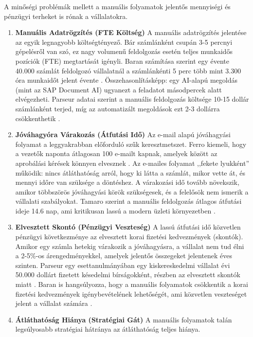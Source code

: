 A minőségi problémák mellett a manuális folyamatok jelentős mennyiségi és pénzügyi terheket is rónak a vállalatokra.
\begin{enumerate}
    \item \textbf{Manuális Adatrögzítés (FTE Költség)} A manuális adatrögzítés jelentése az egyik legnagyobb költségtényező.
    Bár számlánként csupán 3-5 percnyi gépelésről van szó, ez nagy volumenű feldolgozás esetén teljes munkaidős pozíciók (FTE) megtartását igényli.
    Baran számítása szerint egy évente 40.000 számlát feldolgozó vállalatnál a számlánkénti 5 perc több mint 3.300 óra munkaidőt jelent évente \cite{Ascendsoftware-Cost-of-Manual}.
    Összehasonlításképp: egy AI-alapú megoldás (mint az SAP Document AI) ugyanezt a feladatot másodpercek alatt elvégezheti.
    Parseur adatai szerint a manuális feldolgozás költsége 10-15 dollár számlánként terjed, míg az automatizált megoldások ezt 2-3 dollárra csökkenthetik \cite{Parseur-AI-Invoice-Processing}.
    \item \textbf{Jóváhagyóra Várakozás (Átfutási Idő)} Az e-mail alapú jóváhagyási folyamat a leggyakrabban előforduló szűk keresztmetszet.
    Ferro kiemeli, hogy a vezetők naponta átlagosan 100 e-mailt kapnak, amelyek között az aprobálási kérések könnyen elvesznek \cite{Edenredpay-5-Problems}.
    Az e-mailes folyamat ,,fekete lyukként'' működik: nincs átláthatóság arról, hogy ki látta a számlát, mikor vette át, és mennyi időre van szüksége a döntéshez.
    A várakozási idő tovább növekszik, amikor többszörös jóváhagyási körök szükségesek, és a felelősök nem ismerik a vállalati szabályokat.
    Tamaro szerint a manuális feldolgozás átlagos átfutási ideje 14.6 nap, ami kritikusan lassú a modern üzleti környezetben \cite{Caso-Hidden-Costs-of-Manual}.
    \item \textbf{Elvesztett Skontó (Pénzügyi Veszteség)} A lassú átfutási idő közvetlen pénzügyi következménye az elvesztett korai fizetési kedvezmények (skontók).
    Amikor egy számla hetekig várakozik a jóváhagyásra, a vállalat nem tud élni a 2-5\%-os árengedményekkel, amelyek jelentős összegeket jelentenek éves szinten.
    Parseur egy esettanulmányában egy kiskereskedelmi vállalat évi 50.000 dollárt fizetett késedelmi bírságokként, részben az elvesztett skontók miatt \cite{Parseur-AI-Invoice-Processing}.
    Baran is hangsúlyozza, hogy a manuális folyamatok csökkentik a korai fizetési kedvezmények igénybevételének lehetőségét, ami közvetlen veszteséget jelent a vállalat számára \cite{Ascendsoftware-Cost-of-Manual}.
    \item \textbf{Átláthatóság Hiánya (Stratégiai Gát)} A manuális folyamatok talán legsúlyosabb stratégiai hátránya az átláthatóság teljes hiánya.

\end{enumerate}
